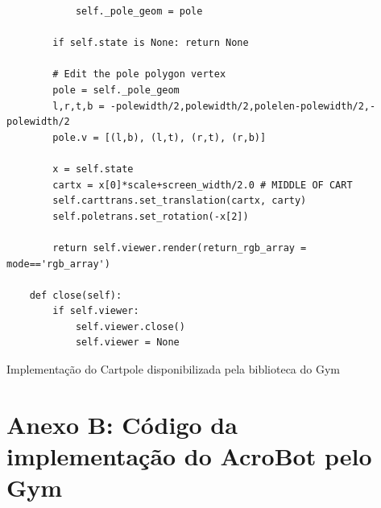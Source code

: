 \documentclass[cic,tc]{iiufrgs}
\newenvironment{longlisting}{\captionsetup{type=listing}}{}
\begin{document}
\begin{longlisting}
\begin{verbatim}
            self._pole_geom = pole

        if self.state is None: return None

        # Edit the pole polygon vertex
        pole = self._pole_geom
        l,r,t,b = -polewidth/2,polewidth/2,polelen-polewidth/2,-polewidth/2
        pole.v = [(l,b), (l,t), (r,t), (r,b)]

        x = self.state
        cartx = x[0]*scale+screen_width/2.0 # MIDDLE OF CART
        self.carttrans.set_translation(cartx, carty)
        self.poletrans.set_rotation(-x[2])

        return self.viewer.render(return_rgb_array = mode=='rgb_array')

    def close(self):
        if self.viewer:
            self.viewer.close()
            self.viewer = None
\end{verbatim}
\caption[Cópia de DNA]{Implementação do Cartpole disponibilizada pela biblioteca do Gym}
\label{source:cartpole_gym}
\end{longlisting}

\chapter*{Anexo B: Código da implementação do AcroBot pelo Gym}
\end{document}
